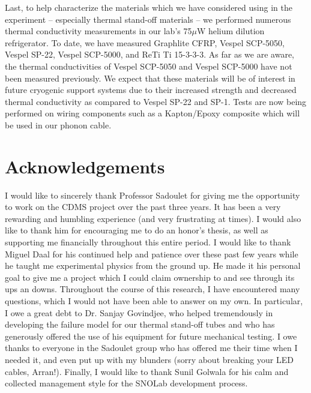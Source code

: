 \documentclass{report}
\begin{document}
Last, to help characterize the materials which we have considered using in the experiment -- especially thermal stand-off materials -- we performed numerous thermal conductivity measurements in our lab's 75$\mu$W helium dilution refrigerator. To date, we have measured Graphlite CFRP, Vespel SCP-5050, Vespel SP-22, Vespel SCP-5000, and ReTi Ti 15-3-3-3. As far as we are aware, the thermal conductivities of Vespel SCP-5050 and Vespel SCP-5000 have not been measured previously. We expect that these materials will be of interest in future cryogenic support systems due to their increased strength and decreased thermal conductivity as compared to Vespel SP-22 and SP-1. Tests are now being performed on wiring components such as a Kapton/Epoxy composite which will be used in our phonon cable.

\section*{Acknowledgements}

I would like to sincerely thank Professor Sadoulet for giving me the opportunity to work on the CDMS project over the past three years. It has been a very rewarding and humbling experience (and very frustrating at times). I would also like to thank him for encouraging me to do an honor's thesis, as well as supporting me financially throughout this entire period. I would like to thank Miguel Daal for his continued help and patience over these past few years while he taught me experimental physics from the ground up. He made it his personal goal to give me a project which I could claim ownership to and see through its ups an downs. Throughout the course of this research, I have encountered many questions, which I would not have been able to answer on my own. In particular, I owe a great debt to Dr. Sanjay Govindjee, who helped tremendously in developing the failure model for our thermal stand-off tubes and who has generously offered the use of his equipment for future mechanical testing. I owe thanks to everyone in the Sadoulet group who has offered me their time when I needed it, and even put up with my blunders (sorry about breaking your LED cables, Arran!). Finally, I would like to thank Sunil Golwala for his calm and collected management style for the SNOLab development process.
\end{document}
